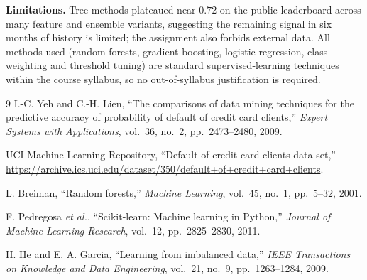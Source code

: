 \documentclass[conference]{IEEEtran}
\begin{document}
\textbf{Limitations.} Tree methods plateaued near $0.72$ on the public leaderboard
across many feature and ensemble variants, suggesting the remaining signal in six
months of history is limited; the assignment also forbids external data. All
methods used (random forests, gradient boosting, logistic regression, class
weighting and threshold tuning) are standard supervised-learning techniques within
the course syllabus, so no out-of-syllabus justification is required.

\begin{thebibliography}{9}
I.-C. Yeh and C.-H. Lien, ``The comparisons of data mining techniques for the
predictive accuracy of probability of default of credit card clients,''
\emph{Expert Systems with Applications}, vol.~36, no.~2, pp.~2473--2480, 2009.

UCI Machine Learning Repository, ``Default of credit card clients data set,''
\url{https://archive.ics.uci.edu/dataset/350/default+of+credit+card+clients}.

L. Breiman, ``Random forests,'' \emph{Machine Learning}, vol.~45, no.~1,
pp.~5--32, 2001.

F. Pedregosa \emph{et al.}, ``Scikit-learn: Machine learning in Python,''
\emph{Journal of Machine Learning Research}, vol.~12, pp.~2825--2830, 2011.

H. He and E. A. Garcia, ``Learning from imbalanced data,'' \emph{IEEE
Transactions on Knowledge and Data Engineering}, vol.~21, no.~9,
pp.~1263--1284, 2009.
\end{thebibliography}
\end{document}
